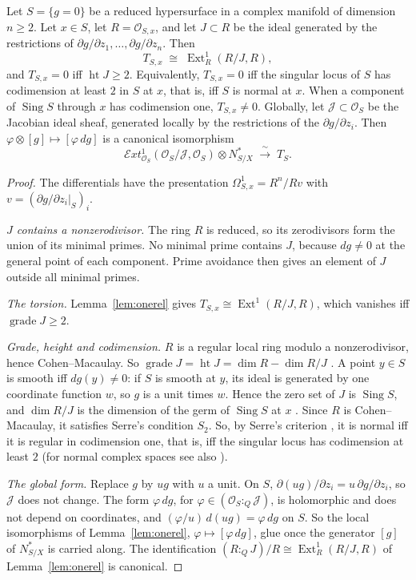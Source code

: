 \begin{proposition}\label{prop:normal}
Let $S=\{g=0\}$ be a reduced hypersurface in a complex manifold of dimension $n\ge2$. Let $x\in S$, let $R=\mathcal O_{S,x}$, and let $J\subset R$ be the ideal generated by the restrictions of $\partial g/\partial z_1,\dots,\partial g/\partial z_n$. Then
\[
T_{S,x}\;\cong\;\operatorname{Ext}^1_R(R/J,R),
\]
and $T_{S,x}=0$ iff $\operatorname{ht}J\ge2$. Equivalently, $T_{S,x}=0$ iff the singular locus of $S$ has codimension at least $2$ in $S$ at $x$, that is, iff $S$ is normal at $x$. When a component of $\operatorname{Sing}S$ through $x$ has codimension one, $T_{S,x}\neq0$. Globally, let $\mathcal J\subset\mathcal O_S$ be the Jacobian ideal sheaf, generated locally by the restrictions of the $\partial g/\partial z_i$. Then $\varphi\otimes[g]\mapsto[\varphi\,dg]$ is a canonical isomorphism
\[
\mathcal{E}xt^1_{\mathcal O_S}(\mathcal O_S/\mathcal J,\mathcal O_S)\otimes N^*_{S/X}\;\xrightarrow{\ \sim\ }\;T_S .
\]
\end{proposition}

\begin{proof}
The differentials have the presentation $\Omega^1_{S,x}=R^n/Rv$ with $v=(\partial g/\partial z_i|_S)_i$.

\emph{$J$ contains a nonzerodivisor.} The ring $R$ is reduced, so its zerodivisors form the union of its minimal primes. No minimal prime contains $J$, because $dg\neq0$ at the general point of each component. Prime avoidance then gives an element of $J$ outside all minimal primes.

\emph{The torsion.} Lemma~\ref{lem:onerel} gives $T_{S,x}\cong\operatorname{Ext}^1(R/J,R)$, which vanishes iff $\operatorname{grade}J\ge2$.

\emph{Grade, height and codimension.} $R$ is a regular local ring modulo a nonzerodivisor, hence Cohen--Macaulay. So $\operatorname{grade}J=\operatorname{ht}J=\dim R-\dim R/J$ \cite[Thm.~17.4]{Mat86}. A point $y\in S$ is smooth iff $dg(y)\neq0$: if $S$ is smooth at $y$, its ideal is generated by one coordinate function $w$, so $g$ is a unit times $w$. Hence the zero set of $J$ is $\operatorname{Sing}S$, and $\dim R/J$ is the dimension of the germ of $\operatorname{Sing}S$ at $x$ \cite{GR84}. Since $R$ is Cohen--Macaulay, it satisfies Serre's condition $S_2$. So, by Serre's criterion \cite[Thm.~23.8]{Mat86}, it is normal iff it is regular in codimension one, that is, iff the singular locus has codimension at least $2$ (for normal complex spaces see also \cite{GR84}).

\emph{The global form.} Replace $g$ by $ug$ with $u$ a unit. On $S$, $\partial(ug)/\partial z_i=u\,\partial g/\partial z_i$, so $\mathcal J$ does not change. The form $\varphi\,dg$, for $\varphi\in(\mathcal O_S:_Q\mathcal J)$, is holomorphic and does not depend on coordinates, and $(\varphi/u)\,d(ug)=\varphi\,dg$ on $S$. So the local isomorphisms of Lemma~\ref{lem:onerel}, $\varphi\mapsto[\varphi\,dg]$, glue once the generator $[g]$ of $N^*_{S/X}$ is carried along. The identification $(R:_QJ)/R\cong\operatorname{Ext}^1_R(R/J,R)$ of Lemma~\ref{lem:onerel} is canonical.
\end{proof}

